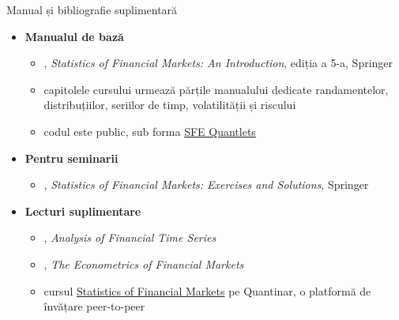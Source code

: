 \begin{frame}{Manual și bibliografie suplimentară}
\itemsize{\small}
\begin{itemize}
    \item \textbf{Manualul de bază}
    \begin{itemize}
        \item {}, \emph{Statistics of Financial Markets: An Introduction}, ediția a 5-a, Springer
        \item capitolele cursului urmează părțile manualului dedicate randamentelor, distribuțiilor, seriilor de timp, volatilității și riscului
        \item codul este public, sub forma \href{https://github.com/QuantLet/SFE}{SFE Quantlets}
    \end{itemize}
    \item \textbf{Pentru seminarii}
    \begin{itemize}
        \item {}, \emph{Statistics of Financial Markets: Exercises and Solutions}, Springer
    \end{itemize}
    \item \textbf{Lecturi suplimentare}
    \begin{itemize}
        \item {}, \emph{Analysis of Financial Time Series}
        \item {}, \emph{The Econometrics of Financial Markets}
        \item cursul \href{https://quantinar.com/course/103/statistics-of-financial-markets}{Statistics of Financial Markets} pe Quantinar, o platformă de învățare peer-to-peer
    \end{itemize}
\end{itemize}
\end{frame}

